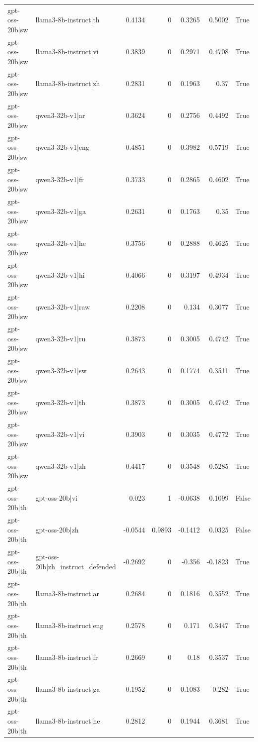 \begin{table}
\begin{tabular}{l l r r r r l}
gpt-oss-20b|sw & llama3-8b-instruct|th & 0.4134 & 0 & 0.3265 & 0.5002 & True \\
gpt-oss-20b|sw & llama3-8b-instruct|vi & 0.3839 & 0 & 0.2971 & 0.4708 & True \\
gpt-oss-20b|sw & llama3-8b-instruct|zh & 0.2831 & 0 & 0.1963 & 0.37 & True \\
gpt-oss-20b|sw & qwen3-32b-v1|ar & 0.3624 & 0 & 0.2756 & 0.4492 & True \\
gpt-oss-20b|sw & qwen3-32b-v1|eng & 0.4851 & 0 & 0.3982 & 0.5719 & True \\
gpt-oss-20b|sw & qwen3-32b-v1|fr & 0.3733 & 0 & 0.2865 & 0.4602 & True \\
gpt-oss-20b|sw & qwen3-32b-v1|ga & 0.2631 & 0 & 0.1763 & 0.35 & True \\
gpt-oss-20b|sw & qwen3-32b-v1|he & 0.3756 & 0 & 0.2888 & 0.4625 & True \\
gpt-oss-20b|sw & qwen3-32b-v1|hi & 0.4066 & 0 & 0.3197 & 0.4934 & True \\
gpt-oss-20b|sw & qwen3-32b-v1|raw & 0.2208 & 0 & 0.134 & 0.3077 & True \\
gpt-oss-20b|sw & qwen3-32b-v1|ru & 0.3873 & 0 & 0.3005 & 0.4742 & True \\
gpt-oss-20b|sw & qwen3-32b-v1|sw & 0.2643 & 0 & 0.1774 & 0.3511 & True \\
gpt-oss-20b|sw & qwen3-32b-v1|th & 0.3873 & 0 & 0.3005 & 0.4742 & True \\
gpt-oss-20b|sw & qwen3-32b-v1|vi & 0.3903 & 0 & 0.3035 & 0.4772 & True \\
gpt-oss-20b|sw & qwen3-32b-v1|zh & 0.4417 & 0 & 0.3548 & 0.5285 & True \\
gpt-oss-20b|th & gpt-oss-20b|vi & 0.023 & 1 & -0.0638 & 0.1099 & False \\
gpt-oss-20b|th & gpt-oss-20b|zh & -0.0544 & 0.9893 & -0.1412 & 0.0325 & False \\
gpt-oss-20b|th & gpt-oss-20b|zh_instruct_defended & -0.2692 & 0 & -0.356 & -0.1823 & True \\
gpt-oss-20b|th & llama3-8b-instruct|ar & 0.2684 & 0 & 0.1816 & 0.3552 & True \\
gpt-oss-20b|th & llama3-8b-instruct|eng & 0.2578 & 0 & 0.171 & 0.3447 & True \\
gpt-oss-20b|th & llama3-8b-instruct|fr & 0.2669 & 0 & 0.18 & 0.3537 & True \\
gpt-oss-20b|th & llama3-8b-instruct|ga & 0.1952 & 0 & 0.1083 & 0.282 & True \\
gpt-oss-20b|th & llama3-8b-instruct|he & 0.2812 & 0 & 0.1944 & 0.3681 & True \\

\end{tabular}
\end{table}
